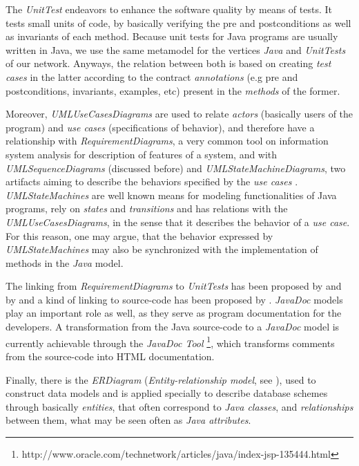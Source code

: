 \documentclass[tuberlin,cic,tc,english,noabntcite]{iiufrgs}
\begin{document}
The \emph{UnitTest} endeavors to enhance the software quality by means of tests. It tests small units of code, by basically verifying the pre and postconditions as well as invariants of each method. Because unit tests for Java programs are usually written in Java, we use the same metamodel for the vertices \emph{Java} and \emph{UnitTests} of our network. Anyways, the relation between both is based on creating \emph{test cases} in the latter according to the contract \emph{annotations} (e.g pre and postconditions, invariants, examples, etc) present in the \emph{methods} of the former.

Moreover, \emph{UMLUseCasesDiagrams} are used to relate \emph{actors} (basically users of the program) and \emph{use cases} (specifications of behavior), and therefore have a relationship with \emph{RequirementDiagrams}, a very common tool on information system analysis for description of features of a system, and with \emph{UMLSequenceDiagrams} (discussed before) and \emph{UMLStateMachineDiagrams}, two artifacts aiming to describe the behaviors specified by the \emph{use cases} \citep[p. 637]{omg2007unified}. \emph{UMLStateMachines} are well known means for modeling functionalities of Java programs, rely on \emph{states} and \emph{transitions} and has relations with the \emph{UMLUseCasesDiagrams}, in the sense that it describes the behavior of a \emph{use case}. For this reason, one may argue, that the behavior expressed by \emph{UMLStateMachines} may also be synchronized with the implementation of methods in the \emph{Java} model.

The linking from \emph{RequirementDiagrams} to \emph{UnitTests} has been proposed by \citet{noack2013automatic} and by \citet{post2009linking} and a kind of linking to source-code has been proposed by \citet{antoniol2002recovering}. \emph{JavaDoc} models play an important role as well, as they serve as program documentation for the developers. A transformation from the Java source-code to a \emph{JavaDoc} model is currently achievable through the \emph{JavaDoc Tool} \footnote{http://www.oracle.com/technetwork/articles/java/index-jsp-135444.html}, which transforms comments from the source-code into HTML documentation.

Finally, there is the \emph{ERDiagram} (\emph{Entity-relationship model}, see \citep{chen1976entity}), used to construct data models and is applied specially to describe database schemes through basically \emph{entities}, that often correspond to \emph{Java classes}, and \emph{relationships} between them, what may be seen often as \emph{Java attributes}.
\end{document}
